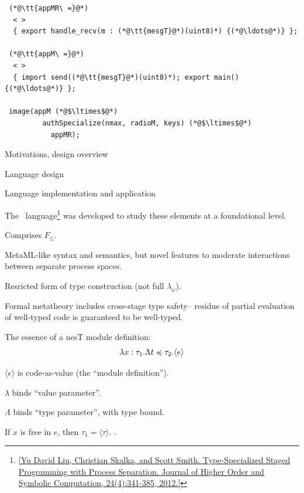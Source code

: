 
\begin{lstlisting}
 (*@\tt{appMR\ =}@*) 
  < >
  { export handle_recv(m : (*@\tt{mesgT}@*)(uint8)*) {(*@\ldots@*)} }; 

 (*@\tt{appM\ =}@*) 
  < >
  { import send((*@\tt{mesgT}@*)(uint8)*); export main() {(*@\ldots@*)} };  

 image(appM (*@$\ltimes$@*)
         authSpecialize(nmax, radioM, keys) (*@$\ltimes$@*)
           appMR);
\end{lstlisting}
\stopslide


\begin{cenumerate}
\item Motivations, design overview
\item {}
\begin{citemize}
\item Language design 
\item {}
\end{citemize}
\item Language implementation and application
\end{cenumerate}
\stopslide


The \fml\ language\footnote{\cref{Yu David Liu, Christian Skalka, and Scott Smith. Type-Specialized Staged Programming with Process Separation. Journal of Higher Order and Symbolic Computation, 24(4):341-385, 2012.}} was developed to study these elements at a foundational level.
\begin{citemize}
\item Comprises $F_{\le}$.
\item MetaML-like syntax and semantics, but novel features to moderate 
interactions between separate process spaces.
\item Resricted form of type construction (not full $\lambda_\omega$).
\item Formal metatheory includes cross-stage type safety-- residue of  
partial evaluation of well-typed code is guaranteed to be well-typed.
\end{citemize}
\stopslide


The essence of a nesT module definition:
{\Large
$$
\lambda x : \tau_1 . \Lambda t \preccurlyeq \tau_2 . \langle e \rangle
$$
}
\begin{citemize}
\item $\langle e \rangle$ is code-as-value (the ``module definition'').
\item $\lambda$ binds ``value parameter''.
\item $\Lambda$ binds ``type parameter'', with type bound.
\item If $x$ is free in $e$, then $\tau_1 = \langle \tau \rangle$. .
\end{citemize}
\stopslide

